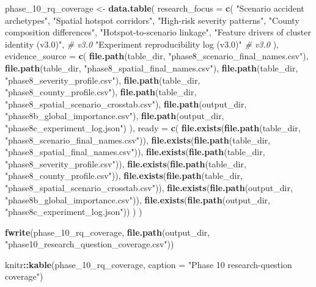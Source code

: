 \documentclass[
]{article}
\newenvironment{Shaded}{\begin{snugshade}}{\end{snugshade}}
\newcommand{\AttributeTok}[1]{\textcolor[rgb]{0.13,0.29,0.53}{#1}}
\newcommand{\CommentTok}[1]{\textcolor[rgb]{0.56,0.35,0.01}{\textit{#1}}}
\newcommand{\FunctionTok}[1]{\textcolor[rgb]{0.13,0.29,0.53}{\textbf{#1}}}
\newcommand{\NormalTok}[1]{#1}
\newcommand{\OtherTok}[1]{\textcolor[rgb]{0.56,0.35,0.01}{#1}}
\newcommand{\SpecialCharTok}[1]{\textcolor[rgb]{0.81,0.36,0.00}{\textbf{#1}}}
\newcommand{\StringTok}[1]{\textcolor[rgb]{0.31,0.60,0.02}{#1}}
\begin{document}
\begin{Shaded}
\begin{Highlighting}[]
\NormalTok{phase\_10\_rq\_coverage }\OtherTok{\textless{}{-}} \FunctionTok{data.table}\NormalTok{(}
  \AttributeTok{research\_focus =} \FunctionTok{c}\NormalTok{(}
    \StringTok{"Scenario accident archetypes"}\NormalTok{,}
    \StringTok{"Spatial hotspot corridors"}\NormalTok{,}
    \StringTok{"High{-}risk severity patterns"}\NormalTok{,}
    \StringTok{"County composition differences"}\NormalTok{,}
    \StringTok{"Hotspot{-}to{-}scenario linkage"}\NormalTok{,}
    \StringTok{"Feature drivers of cluster identity (v3.0)"}\NormalTok{,    }\CommentTok{\# v3.0}
    \StringTok{"Experiment reproducibility log (v3.0)"}           \CommentTok{\# v3.0}
\NormalTok{  ),}
  \AttributeTok{evidence\_source =} \FunctionTok{c}\NormalTok{(}
    \FunctionTok{file.path}\NormalTok{(table\_dir, }\StringTok{"phase8\_scenario\_final\_names.csv"}\NormalTok{),}
    \FunctionTok{file.path}\NormalTok{(table\_dir, }\StringTok{"phase8\_spatial\_final\_names.csv"}\NormalTok{),}
    \FunctionTok{file.path}\NormalTok{(table\_dir, }\StringTok{"phase8\_severity\_profile.csv"}\NormalTok{),}
    \FunctionTok{file.path}\NormalTok{(table\_dir, }\StringTok{"phase8\_county\_profile.csv"}\NormalTok{),}
    \FunctionTok{file.path}\NormalTok{(table\_dir, }\StringTok{"phase8\_spatial\_scenario\_crosstab.csv"}\NormalTok{),}
    \FunctionTok{file.path}\NormalTok{(output\_dir, }\StringTok{"phase8b\_global\_importance.csv"}\NormalTok{),}
    \FunctionTok{file.path}\NormalTok{(output\_dir, }\StringTok{"phase8c\_experiment\_log.json"}\NormalTok{)}
\NormalTok{  ),}
  \AttributeTok{ready =} \FunctionTok{c}\NormalTok{(}
    \FunctionTok{file.exists}\NormalTok{(}\FunctionTok{file.path}\NormalTok{(table\_dir, }\StringTok{"phase8\_scenario\_final\_names.csv"}\NormalTok{)),}
    \FunctionTok{file.exists}\NormalTok{(}\FunctionTok{file.path}\NormalTok{(table\_dir, }\StringTok{"phase8\_spatial\_final\_names.csv"}\NormalTok{)),}
    \FunctionTok{file.exists}\NormalTok{(}\FunctionTok{file.path}\NormalTok{(table\_dir, }\StringTok{"phase8\_severity\_profile.csv"}\NormalTok{)),}
    \FunctionTok{file.exists}\NormalTok{(}\FunctionTok{file.path}\NormalTok{(table\_dir, }\StringTok{"phase8\_county\_profile.csv"}\NormalTok{)),}
    \FunctionTok{file.exists}\NormalTok{(}\FunctionTok{file.path}\NormalTok{(table\_dir, }\StringTok{"phase8\_spatial\_scenario\_crosstab.csv"}\NormalTok{)),}
    \FunctionTok{file.exists}\NormalTok{(}\FunctionTok{file.path}\NormalTok{(output\_dir, }\StringTok{"phase8b\_global\_importance.csv"}\NormalTok{)),}
    \FunctionTok{file.exists}\NormalTok{(}\FunctionTok{file.path}\NormalTok{(output\_dir, }\StringTok{"phase8c\_experiment\_log.json"}\NormalTok{))}
\NormalTok{  )}
\NormalTok{)}

\FunctionTok{fwrite}\NormalTok{(phase\_10\_rq\_coverage, }\FunctionTok{file.path}\NormalTok{(output\_dir, }\StringTok{"phase10\_research\_question\_coverage.csv"}\NormalTok{))}

\NormalTok{knitr}\SpecialCharTok{::}\FunctionTok{kable}\NormalTok{(phase\_10\_rq\_coverage, }\AttributeTok{caption =} \StringTok{"Phase 10 research{-}question coverage"}\NormalTok{)}
\end{Highlighting}
\end{Shaded}
\end{document}
